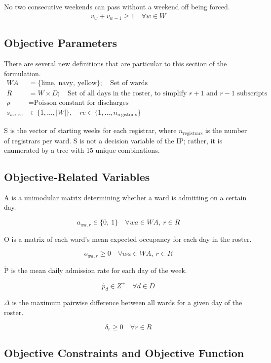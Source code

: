 \documentclass[a4paper]{article}
\begin{document}
No two consecutive weekends can pass without a weekend off being forced.
\begin{align}
  v_w + v_{w-1} \ge 1 \quad\forall w\in W
\end{align}

\subsection{Objective Parameters}

There are several new definitions that are particular to this section of the formulation.
\begin{align*}
  WA &= \{\text{lime},\ \text{navy},\ \text{yellow}\};\quad\text{Set of wards}\\
  R &= W\times D;\quad\text{Set of all days in the roster, to simplify $r+1$ and $r-1$ subscripts}\\
  \rho &= \text{Poisson constant for discharges}\\
  s_{wa,re} &\in \{1,\dots,|W|\}, \quad re \in \{1,\dots,n_\text{registrars}\}
\end{align*}

S is the vector of starting weeks for each registrar, where $n_\text{registrars}$ is the number of registrars per ward. S is not a decision variable of the IP; rather, it is enumerated by a tree with 15 unique combinations.

\subsection{Objective-Related Variables}

A is a unimodular matrix determining whether a ward is admitting on a certain day.

$$a_{wa, r} \in \{0,\ 1\} \quad\forall wa\in WA,\ r\in R$$

O is a matrix of each ward's mean expected occupancy for each day in the roster.

$$o_{wa, r} \ge 0 \quad\forall wa\in WA,\ r\in R$$

$\dot{\text{P}}$ is the mean daily admission rate for each day of the week.

$$\dot{p_{d}} \in Z^+ \quad\forall d\in D$$

$\Delta$ is the maximum pairwise difference between all wards for a given day of the roster.

$$\delta_r \ge 0 \quad\forall r \in R$$

\subsection{Objective Constraints and Objective Function}
\end{document}
